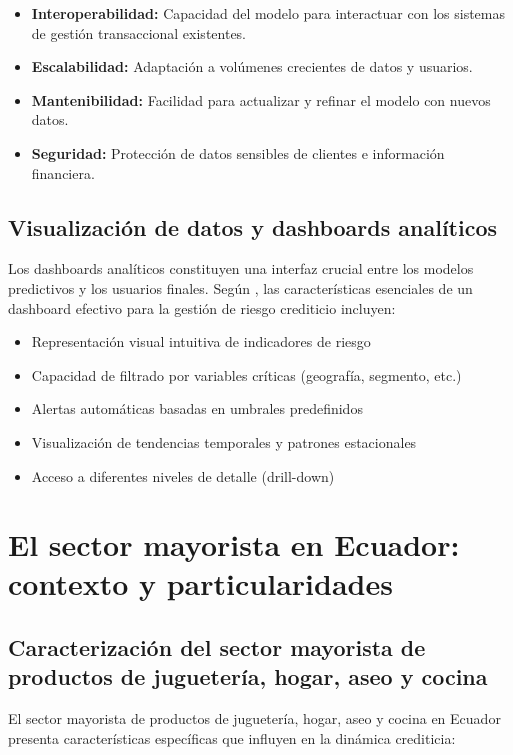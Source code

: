\begin{itemize}
    \item \textbf{Interoperabilidad:} Capacidad del modelo para interactuar con los sistemas de gestión transaccional existentes.
    \item \textbf{Escalabilidad:} Adaptación a volúmenes crecientes de datos y usuarios.
    \item \textbf{Mantenibilidad:} Facilidad para actualizar y refinar el modelo con nuevos datos.
    \item \textbf{Seguridad:} Protección de datos sensibles de clientes e información financiera.
\end{itemize}

\subsection{Visualización de datos y dashboards analíticos}
Los dashboards analíticos constituyen una interfaz crucial entre los modelos predictivos y los usuarios finales. Según \cite{torres2023inteligencia}, las características esenciales de un dashboard efectivo para la gestión de riesgo crediticio incluyen:

\begin{itemize}
    \item Representación visual intuitiva de indicadores de riesgo
    \item Capacidad de filtrado por variables críticas (geografía, segmento, etc.)
    \item Alertas automáticas basadas en umbrales predefinidos
    \item Visualización de tendencias temporales y patrones estacionales
    \item Acceso a diferentes niveles de detalle (drill-down)
\end{itemize}

\section{El sector mayorista en Ecuador: contexto y particularidades}
\subsection{Caracterización del sector mayorista de productos de juguetería, hogar, aseo y cocina}
El sector mayorista de productos de juguetería, hogar, aseo y cocina en Ecuador presenta características específicas que influyen en la dinámica crediticia:

